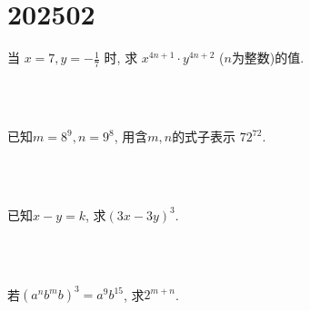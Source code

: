 \section{202502}

\item{
    当 $ x=7, y=-\frac{1}{7}$ 时, 求 $x^{4n+1}\cdot y^{4n+2}$ ($n$为整数)的值.
    \iffalse
    \fangsong\zihao{4}
    思路: 观察到$xy=-1$,让将$x$和$y$凑成一对,相乘.直接将$x, y$的值代入表达式中进行计算.
    
    解答: 
    \begin{align*}
        \mbox{原式} &= 7^{4n+1}\cdot \left(-\frac{1}{7}\right) ^{4n+2}\\
        &= [7\times(-\frac{1}{7})]^{4n+1} \cdot(-\frac{1}{7})\\
        &= (-1)^{4n+1} \cdot(-\frac{1}{7})\\
        &= \frac{1}{7}.
    \end{align*}
    \fi
} 
\\ \\
\item{
    已知$ m=8^9, n=9^8 $, 用含$m, n$的式子表示 $72^{72}$.
    \iffalse
    \fangsong\zihao{4}
    思路: 观察到$72=8\times 9$,将原式中的72分解,凑出$m, n$.
    
    解答: 
    \begin{align*}
        \mbox{原式} &= (8\times 9)^{72}\\
        &= 8^{72}\times 9^{72}\\
        &= (8^9)^8\times (9^8)^9\\
        &= m^8 n^9.
    \end{align*}
    \fi
} 
\\ \\
\item{
    已知$x-y=k$, 求$(3x-3y)^3.$
    \iffalse
    \fangsong\zihao{4}
    解答: 
    \begin{align*}
        \mbox{原式} &= [3(x-y)]^3\\
        &= 27(x-y)^3\\
        &= 27k^3.
    \end{align*}
    \fi
} 
\\ \\
\item{
    若$(a^nb^mb)^3 = a^9 b^{15}$, 求$2^{m+n}$.
    \iffalse
    \fangsong\zihao{4}
    思路: 先将左边化简,再与右边比较,解出$m,n$.
    
    解答: 
    \begin{align*}
        (a^nb^{m+1})^3 &= a^9b^{15}\\
        a^{3n}b^{3m+3} &= a^9b^{15}
    \end{align*}
    $\therefore 3n=9, 3m+3=15$\\
    $\therefore n=3, m=4$
    \begin{align*}
        2^{m+n} &= 2^7\\
        &= 128.
    \end{align*}
    \fi
}
